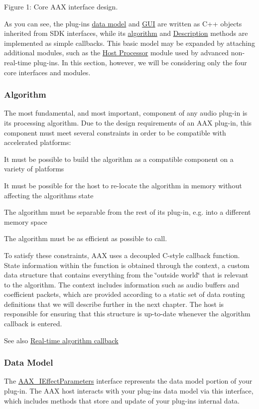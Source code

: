   Figure 1\+: Core A\+A\+X interface design.

As you can see, the plug-\/in\textquotesingle{}s \hyperlink{a00328}{data model} and \hyperlink{a00329}{G\+U\+I} are written as C++ objects inherited from S\+D\+K interfaces, while its \hyperlink{a00327}{algorithm} and \hyperlink{a00326}{Description} methods are implemented as simple callbacks. This basic model may be expanded by attaching additional modules, such as the \hyperlink{a00334}{Host Processor} module used by advanced non-\/real-\/time plug-\/ins. In this section, however, we will be considering only the four core interfaces and modules.

\hypertarget{a00324_subsection__algorithm}{}\subsubsection{Algorithm}\label{a00324_subsection__algorithm}
The most fundamental, and most important, component of any audio plug-\/in is its processing algorithm. Due to the design requirements of an A\+A\+X plug-\/in, this component must meet several constraints in order to be compatible with accelerated platforms\+: 
\begin{DoxyEnumerate}
\item It must be possible to build the algorithm as a compatible component on a variety of platforms  
\item It must be possible for the host to re-\/locate the algorithm in memory without affecting the algorithm\textquotesingle{}s state  
\item The algorithm must be separable from the rest of its plug-\/in, e.\+g. into a different memory space  
\item The algorithm must be as efficient as possible to call.  
\end{DoxyEnumerate}

To satisfy these constraints, A\+A\+X uses a decoupled C-\/style callback function. State information within the function is obtained through the context, a custom data structure that contains everything from the \char`\"{}outside world\char`\"{} that is relevant to the algorithm. The context includes information such as audio buffers and coefficient packets, which are provided according to a static set of data routing definitions that we will describe further in the next chapter. The host is responsible for ensuring that this structure is up-\/to-\/date whenever the algorithm callback is entered.

\begin{DoxySeeAlso}{See also}
\hyperlink{a00327}{Real-\/time algorithm callback}
\end{DoxySeeAlso}
\hypertarget{a00324_subsection__data_model}{}\subsubsection{Data Model}\label{a00324_subsection__data_model}
The \hyperlink{a00099}{A\+A\+X\+\_\+\+I\+Effect\+Parameters} interface represents the data model portion of your plug-\/in. The A\+A\+X host interacts with your plug-\/in\textquotesingle{}s data model via this interface, which includes methods that store and update of your plug-\/in\textquotesingle{}s internal data.


